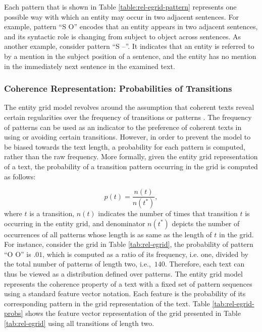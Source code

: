 Each pattern that is shown in Table \ref{table:rel-egrid-pattern} represents one possible way with which an entity may occur in two adjacent sentences. 
For example, pattern ``S O'' encodes that an entity appears in two adjacent sentences, and its syntactic role is changing from subject to object across sentences. 
As another example, consider pattern ``S --''. 
It indicates that an entity is referred to by a mention in the subject position of a sentence, and the entity has no mention in the immediately next sentence in the examined text.  

\subsubsection{Coherence Representation: Probabilities of Transitions}
%
The entity grid model revolves around the assumption that coherent texts reveal certain regularities over the frequency of transitions or patterns \cite{barzilay05a,barzilay08}.    
The frequency of patterns can be used as an indicator to the preference of coherent texts in using or avoiding certain transitions. 
However, in order to prevent the model to be biased towards the text length, a probability for each pattern is computed, rather than the raw frequency. 	 
More formally, given the entity grid representation of a text, the probability of a transition pattern occurring in the grid is computed as follows:

\begin{equation}
p(t) = \frac{n(t)}{n(t^*)},
\end{equation}
where $t$ is a transition, $n(t)$ indicates the number of times that transition $t$ is occurring in the entity grid, and denominator $n(t^*)$ depicts the number of occurrences of all patterns whose length is as same as the length of $t$ in the grid. 
For instance, consider the grid in Table \ref{tab:rel-egrid}, the probability of pattern ``O O'' is $.01$, which is computed as a ratio of its frequency, i.e. one, divided by the total number of patterns of length two, i.e.,\ $140$. 
Therefore, each text can thus be viewed as a distribution defined over patterns. 
The entity grid model represents the coherence property of a text with a fixed set of pattern sequences using a standard feature vector notation.
Each feature is the probability of its corresponding pattern in the grid representation of the text.  
Table \ref{tab:rel-egrid-probs} shows the feature vector representation of the grid presented in Table \ref{tab:rel-egrid} using all transitions of length two. 

